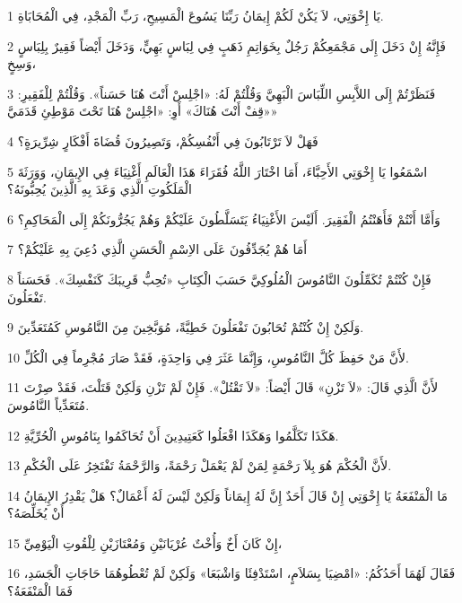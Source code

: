 \par 1 يَا إِخْوَتِي، لاَ يَكُنْ لَكُمْ إِيمَانُ رَبِّنَا يَسُوعَ الْمَسِيحِ، رَبِّ الْمَجْدِ، فِي الْمُحَابَاةِ.
\par 2 فَإِنَّهُ إِنْ دَخَلَ إِلَى مَجْمَعِكُمْ رَجُلٌ بِخَوَاتِمِ ذَهَبٍ فِي لِبَاسٍ بَهِيٍّ، وَدَخَلَ أَيْضاً فَقِيرٌ بِلِبَاسٍ وَسِخٍ،
\par 3 فَنَظَرْتُمْ إِلَى اللاَّبِسِ اللِّبَاسَ الْبَهِيَّ وَقُلْتُمْ لَهُ: «اجْلِسْ أَنْتَ هُنَا حَسَناً». وَقُلْتُمْ لِلْفَقِيرِ: «قِفْ أَنْتَ هُنَاكَ» أَوِ: «اجْلِسْ هُنَا تَحْتَ مَوْطِئِ قَدَمَيَّ»
\par 4 فَهَلْ لاَ تَرْتَابُونَ فِي أَنْفُسِكُمْ، وَتَصِيرُونَ قُضَاةَ أَفْكَارٍ شِرِّيرَةٍ؟
\par 5 اسْمَعُوا يَا إِخْوَتِي الأَحِبَّاءَ، أَمَا اخْتَارَ اللَّهُ فُقَرَاءَ هَذَا الْعَالَمِ أَغْنِيَاءَ فِي الإِيمَانِ، وَوَرَثَةَ الْمَلَكُوتِ الَّذِي وَعَدَ بِهِ الَّذِينَ يُحِبُّونَهُ؟
\par 6 وَأَمَّا أَنْتُمْ فَأَهَنْتُمُ الْفَقِيرَ. أَلَيْسَ الأَغْنِيَاءُ يَتَسَلَّطُونَ عَلَيْكُمْ وَهُمْ يَجُرُّونَكُمْ إِلَى الْمَحَاكِمِ؟
\par 7 أَمَا هُمْ يُجَدِّفُونَ عَلَى الاِسْمِ الْحَسَنِ الَّذِي دُعِيَ بِهِ عَلَيْكُمْ؟
\par 8 فَإِنْ كُنْتُمْ تُكَمِّلُونَ النَّامُوسَ الْمُلُوكِيَّ حَسَبَ الْكِتَابِ «تُحِبُّ قَرِيبَكَ كَنَفْسِكَ». فَحَسَناً تَفْعَلُونَ.
\par 9 وَلَكِنْ إِنْ كُنْتُمْ تُحَابُونَ تَفْعَلُونَ خَطِيَّةً، مُوَبَّخِينَ مِنَ النَّامُوسِ كَمُتَعَدِّينَ.
\par 10 لأَنَّ مَنْ حَفِظَ كُلَّ النَّامُوسِ، وَإِنَّمَا عَثَرَ فِي وَاحِدَةٍ، فَقَدْ صَارَ مُجْرِماً فِي الْكُلِّ.
\par 11 لأَنَّ الَّذِي قَالَ: «لاَ تَزْنِ» قَالَ أَيْضاً: «لاَ تَقْتُلْ». فَإِنْ لَمْ تَزْنِ وَلَكِنْ قَتَلْتَ، فَقَدْ صِرْتَ مُتَعَدِّياً النَّامُوسَ.
\par 12 هَكَذَا تَكَلَّمُوا وَهَكَذَا افْعَلُوا كَعَتِيدِينَ أَنْ تُحَاكَمُوا بِنَامُوسِ الْحُرِّيَّةِ.
\par 13 لأَنَّ الْحُكْمَ هُوَ بِلاَ رَحْمَةٍ لِمَنْ لَمْ يَعْمَلْ رَحْمَةً، وَالرَّحْمَةُ تَفْتَخِرُ عَلَى الْحُكْمِ.
\par 14 مَا الْمَنْفَعَةُ يَا إِخْوَتِي إِنْ قَالَ أَحَدٌ إِنَّ لَهُ إِيمَاناً وَلَكِنْ لَيْسَ لَهُ أَعْمَالٌ؟ هَلْ يَقْدِرُ الإِيمَانُ أَنْ يُخَلِّصَهُ؟
\par 15 إِنْ كَانَ أَخٌ وَأُخْتٌ عُرْيَانَيْنِ وَمُعْتَازَيْنِ لِلْقُوتِ الْيَوْمِيِّ،
\par 16 فَقَالَ لَهُمَا أَحَدُكُمُ: «امْضِيَا بِسَلاَمٍ، اسْتَدْفِئَا وَاشْبَعَا» وَلَكِنْ لَمْ تُعْطُوهُمَا حَاجَاتِ الْجَسَدِ، فَمَا الْمَنْفَعَةُ؟
